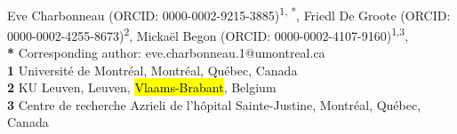 \documentclass[10pt,letterpaper]{article}
\begin{document}
\vspace*{0.2in}

\begin{flushleft}
{\Large
\textbf{} %
}
\newline
\\
Eve Charbonneau (ORCID: 0000-0002-9215-3885)\textsuperscript{1, *},
Friedl De Groote (ORCID: 0000-0002-4255-8673)\textsuperscript{2},  %
Mickaël Begon (ORCID: 0000-0002-4107-9160)\textsuperscript{1,3},
\\
\bigskip
\textbf{*} Corresponding author: eve.charbonneau.1@umontreal.ca
\\
\textbf{1} Université de Montréal, Montréal, Québec, Canada 
\\
\textbf{2} KU Leuven, Leuven, \hl{Vlaams-Brabant}, Belgium
\\
\textbf{3} Centre de recherche Azrieli de l'hôpital Sainte-Justine, Montréal, Québec, Canada
\\
\bigskip

% 
%






\end{flushleft}
\end{document}

